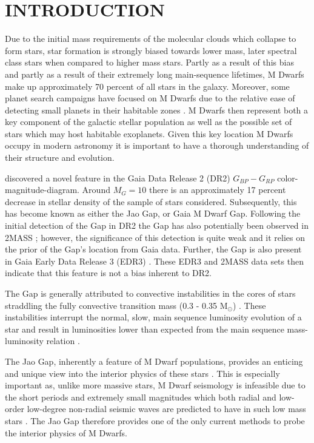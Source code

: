 \section{INTRODUCTION}\label{sec:intro}
Due to the initial mass requirements of the molecular clouds which collapse to form
stars, star formation is strongly biased towards lower mass, later spectral
class stars when compared to higher mass stars. Partly as a result of this
bias and partly as a result of their extremely long main-sequence lifetimes,
M Dwarfs make up approximately 70 percent of all stars in the galaxy. Moreover,
some planet search campaigns have focused on M Dwarfs due to the relative ease
of detecting small planets in their habitable zones \citep[e.g.][]{Nut08}.
M Dwarfs then represent both a key component of the galactic stellar population
as well as the possible set of stars which may host habitable exoplanets.
Given this key location M Dwarfs occupy in modern astronomy it is important to
have a thorough understanding of their structure and evolution.

\citet{Jao2018} discovered a novel feature in the Gaia Data Release 2 (DR2)
$G_{BP}-G_{RP}$ color-magnitude-diagram. Around $M_{G}=10$ there is an
approximately 17 percent decrease in stellar density of the sample of stars
\citet{Jao2018} considered. Subsequently, this has become known as either the
Jao Gap, or Gaia M Dwarf Gap. Following the initial detection of the Gap in DR2
the Gap has also potentially been observed in 2MASS \citep{Skrutskie2006,
Jao2018}; however, the significance of this detection is quite weak and it
relies on the prior of the Gap's location from Gaia data. Further, the Gap is
also present in Gaia Early Data Release 3 (EDR3) \citep{Jao2021}. These EDR3
and 2MASS data sets then indicate that this feature is not a bias inherent to
DR2.

The Gap is generally attributed to convective instabilities in the cores of
stars straddling the fully convective transition mass (0.3 - 0.35 M$_{\odot}$)
\citep{Baraffe2018}. These instabilities interrupt the normal, slow, main
sequence luminosity evolution of a star and result in luminosities lower
than expected from the main sequence mass-luminosity relation \citep{Jao2020}.

The Jao Gap, inherently a feature of M Dwarf populations, provides an enticing
and unique view into the interior physics of these stars \citep{Feiden2021}.
This is especially important as, unlike more massive stars, M Dwarf seismology
is infeasible due to the short periods and extremely small
magnitudes which both radial and low-order low-degree non-radial seismic waves
are predicted to have in such low mass stars \citep{Rodriguez-Lopez2019}. The
Jao Gap therefore provides one of the only current methods to probe the
interior physics of M Dwarfs.

